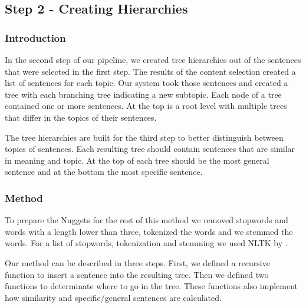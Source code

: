 
\subsection{Step 2 - Creating Hierarchies}

\subsubsection{Introduction}

In the second step of our pipeline, we created tree hierarchies out of the sentences that were selected in the first step. The results of the content selection created a list of sentences for each topic. Our system took those sentences and created a tree with each branching tree indicating a new subtopic. Each node of a tree contained one or more sentences. At the top is a root level with multiple trees that differ in the topics of their sentences. 

The tree hierarchies are built for the third step to better distinguish between topics of sentences. Each resulting tree should contain sentences that are similar in meaning and topic. At the top of each tree should be the most general sentence and at the bottom the most specific sentence.

\subsubsection{Method}

To prepare the Nuggets for the rest of this method we removed stopwords and words with a length lower than three, tokenized the words and we stemmed the words. For a list of stopwords, tokenization and stemming we used NLTK by \cite{nltk}.

Our method can be described in three steps. First, we defined a recursive function to insert a sentence into the resulting tree. Then we defined two functions to determinate where to go in the tree. These functions also implement how similarity and specific/general sentences are calculated.

